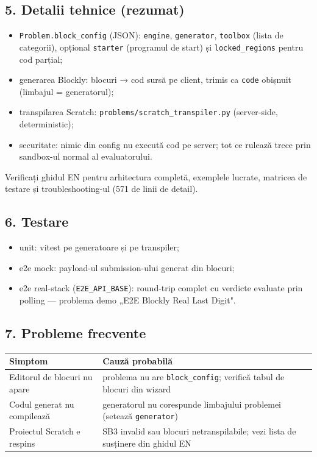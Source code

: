 \documentclass[
]{article}
\newcounter{none} %
\providecommand{\tightlist}{%
  \setlength{\itemsep}{0pt}\setlength{\parskip}{0pt}}
\begin{document}
\subsection{5. Detalii tehnice
(rezumat)}\label{5-detalii-tehnice-rezumat}

\begin{itemize}
\tightlist
\item
  \texttt{Problem.block\_config} (JSON): \texttt{engine},
  \texttt{generator}, \texttt{toolbox} (lista de categorii), opțional
  \texttt{starter} (programul de start) și \texttt{locked\_regions}
  pentru cod parțial;
\item
  generarea Blockly: blocuri → cod sursă pe client, trimis ca
  \texttt{code} obișnuit (limbajul = generatorul);
\item
  transpilarea Scratch: \texttt{problems/scratch\_transpiler.py}
  (server-side, deterministic);
\item
  securitate: nimic din config nu execută cod pe server; tot ce rulează
  trece prin sandbox-ul normal al evaluatorului.
\end{itemize}

Verificați ghidul EN pentru arhitectura completă, exemplele lucrate,
matricea de testare și troubleshooting-ul (571 de linii de detail).

\subsection{6. Testare}\label{6-testare}

\begin{itemize}
\tightlist
\item
  unit: vitest pe generatoare și pe transpiler;
\item
  e2e mock: payload-ul submission-ului generat din blocuri;
\item
  e2e real-stack (\texttt{E2E\_API\_BASE}): round-trip complet cu
  verdicte evaluate prin polling --- problema demo „E2E Blockly Real
  Last Digit".
\end{itemize}

\subsection{7. Probleme frecvente}\label{7-probleme-frecvente}

{\def\LTcaptype{none} %
\begin{longtable}[]{@{}ll@{}}
\toprule\noalign{}
Simptom & Cauză probabilă \\
\midrule\noalign{}
\endhead
\bottomrule\noalign{}
\endlastfoot
Editorul de blocuri nu apare & problema nu are \texttt{block\_config};
verifică tabul de blocuri din wizard \\
Codul generat nu compilează & generatorul nu corespunde limbajului
problemei (setează \texttt{generator}) \\
Proiectul Scratch e respins & SB3 invalid sau blocuri netranspilabile;
vezi lista de susținere din ghidul EN \\
\end{longtable}
}
\end{document}
